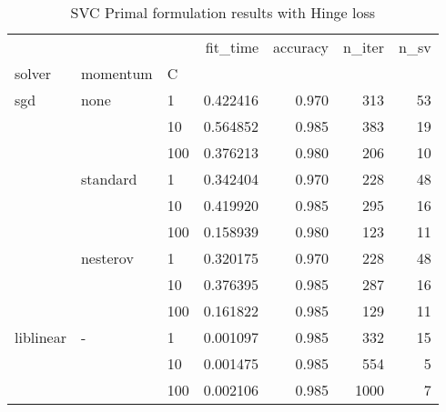 \begin{table}[H]
\centering
\caption{SVC Primal formulation results with Hinge loss}
\label{primal_l1_svc_cv_results}
\begin{tabular}{lllrrrr}
\toprule
          &   &     &  fit\_time &  accuracy &  n\_iter &  n\_sv \\
solver & momentum & C &           &           &         &       \\
\midrule
sgd & none & 1   &  0.422416 &     0.970 &     313 &    53 \\
          &   & 10  &  0.564852 &     0.985 &     383 &    19 \\
          &   & 100 &  0.376213 &     0.980 &     206 &    10 \\
          & standard & 1   &  0.342404 &     0.970 &     228 &    48 \\
          &   & 10  &  0.419920 &     0.985 &     295 &    16 \\
          &   & 100 &  0.158939 &     0.980 &     123 &    11 \\
          & nesterov & 1   &  0.320175 &     0.970 &     228 &    48 \\
          &   & 10  &  0.376395 &     0.985 &     287 &    16 \\
          &   & 100 &  0.161822 &     0.985 &     129 &    11 \\
liblinear & - & 1   &  0.001097 &     0.985 &     332 &    15 \\
          &   & 10  &  0.001475 &     0.985 &     554 &     5 \\
          &   & 100 &  0.002106 &     0.985 &    1000 &     7 \\
\bottomrule
\end{tabular}
\end{table}
